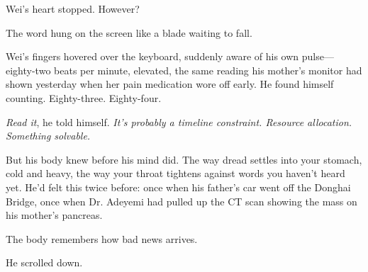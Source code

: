 Wei's heart stopped. However?

The word hung on the screen like a blade waiting to fall.

Wei's fingers hovered over the keyboard, suddenly aware of his own pulse---eighty-two beats per minute, elevated, the same reading his mother's monitor had shown yesterday when her pain medication wore off early. He found himself counting. Eighty-three. Eighty-four.

\emph{Read it}, he told himself. \emph{It's probably a timeline constraint. Resource allocation. Something solvable.}

But his body knew before his mind did. The way dread settles into your stomach, cold and heavy, the way your throat tightens against words you haven't heard yet. He'd felt this twice before: once when his father's car went off the Donghai Bridge, once when Dr. Adeyemi had pulled up the CT scan showing the mass on his mother's pancreas.

The body remembers how bad news arrives.

He scrolled down.

